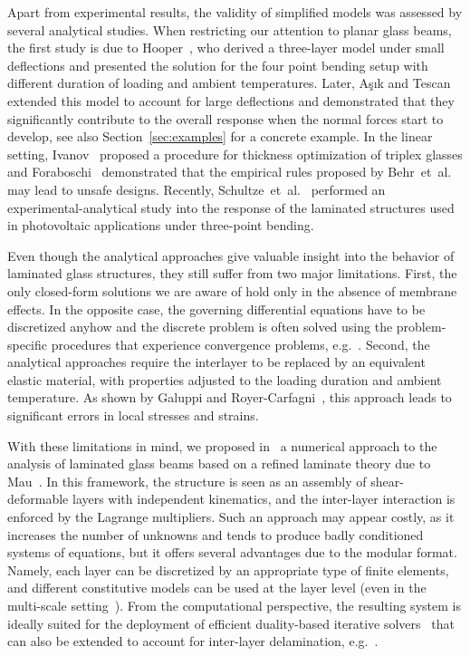 \documentclass[11pt]{article}
\newcommand{\rev}[1]{#1}
\newcommand{\etal}{et~al.}
\newcommand{\Sref}[1]{Section~\ref{#1}}
\begin{document}
Apart from experimental results, the validity of simplified models was assessed
by several analytical studies. When restricting our attention to planar glass
beams, the first study is due to Hooper~\cite{Hooper:1973:BAL}, who derived a
three-layer model under small deflections and presented the solution for the
four point bending setup with different duration of loading and ambient
temperatures. Later, A\c{s}\i{}k and Tescan~\cite{Asik:2005:MMB} extended this
model to account for large deflections and demonstrated that they significantly
contribute to the overall response when the normal forces start to develop, see
also \Sref{sec:examples} for a concrete example. In the linear setting,
Ivanov~\cite{Ivanov:2006:AMO} proposed a procedure for thickness optimization of
triplex glasses and Foraboschi~\cite{Foraboschi:2007:BFS} demonstrated that the
empirical rules proposed by Behr~\etal~\cite{Behr:1993:SBA} may lead to unsafe
designs. Recently, Schultze~\etal~\cite{Schultze:2012:ALG} performed an
experimental-analytical study into the response of the laminated structures used
in photovoltaic applications under three-point bending.

Even though the analytical approaches give valuable insight into the behavior of
laminated glass structures, they still suffer from two major limitations. First,
the only closed-form solutions we are aware of hold only in the absence of
membrane effects. In the opposite case, the governing differential equations
have to be discretized anyhow and the discrete problem is often solved using the
problem-specific procedures that experience convergence problems,
e.g.~\cite{Asik:2003:LGP}. Second, the analytical approaches require the
interlayer to be replaced by an equivalent elastic material, with properties
adjusted to the loading duration and ambient temperature. As shown by Galuppi
and Royer-Carfagni~\cite{Galuppi:2012:LBV}, this approach leads to significant
errors in local stresses and strains.

With these limitations in mind, we proposed in~\cite{Zemanova:2008:SNM} a
numerical approach to the analysis of laminated glass beams based on a refined
laminate theory due to Mau~\cite{Mau:1973:RLP}. In this framework, the structure
is seen as an assembly of shear-deformable layers with independent kinematics,
and the inter-layer interaction is enforced by the Lagrange multipliers.
\rev{Such an approach may appear costly, as it increases the number of
unknowns and tends to produce badly conditioned systems of equations, but it
offers several advantages due to the modular format. Namely, each layer can be
discretized by an appropriate type of finite elements, and different
constitutive models can be used at the layer level (even in the multi-scale
setting~\cite{Sejnoha:1996:MMU}). From the computational perspective, the
resulting system is ideally suited for the deployment of efficient duality-based iterative
solvers~\cite{Kruis:2002:SLP} that can also be extended to account for
inter-layer delamination, e.g.~\cite{Kruis:2008:RMI,Roubicek:2013:DAC}.}
\end{document}
